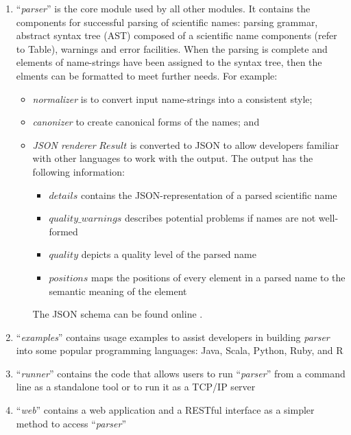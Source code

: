 \documentclass{bmcart}
\begin{document}
\begin{enumerate}
  \item ``\textit{parser}'' is the core module used by all other modules. It contains the components for successful parsing of scientific names: parsing grammar, abstract syntax tree (AST) composed of a scientific name components (refer to Table), warnings and error facilities.  When the parsing is complete and elements of name-strings have been assigned to the syntax tree, then the elments can be formatted to meet further needs.  For example: 
  
  
\begin{itemize}

  \item \textit{normalizer} is to convert input name-strings into a consistent style;

  \item \textit{canonizer} to create canonical forms of the names; and

  \item \textit{JSON renderer}  $Result$ is converted to JSON \cite{bray2014javascript} to allow developers familiar with other languages to work with the output.  The output has the following information:


\begin{itemize}
  \item $details$ contains the JSON-representation of a parsed scientific name
  \item $quality\_warnings$ describes potential problems if names are not
    well-formed
  \item $quality$ depicts a quality level of the parsed name
  \item $positions$ maps the positions of every element in a parsed name to
    the semantic meaning of the element
\end{itemize}

The JSON schema can be found online \cite{gnparser-json}.
  

\end{itemize}



  
  \item ``\textit{examples}'' contains usage examples to assist developers in building \textit{parser} into some popular programming languages: Java, Scala, Python, Ruby, and R
  \item ``\textit{runner}'' contains the code that allows users to run ``\textit{parser}''
  from a command line as a standalone tool or to run it as a TCP/IP server
  \item ``\textit{web}'' contains a web application and a RESTful interface as a simpler method to access ``\textit{parser}''
\end{enumerate}
\end{document}
